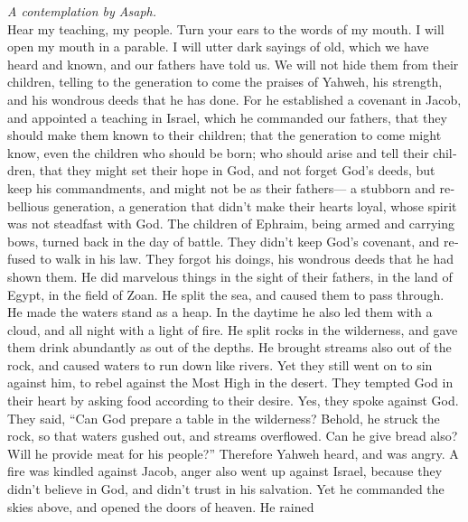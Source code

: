 \begin{paracol}{2}
\begin{otherlanguage}{english}
\emph{A contemplation by Asaph.}\\
 Hear my teaching, my people. Turn your ears to the words
of my mouth.  I will open my mouth in a parable. I will
utter dark sayings of old,  which we have heard and known,
and our fathers have told us.  We will not hide them from
their children, telling to the generation to come the praises of Yahweh,
his strength, and his wondrous deeds that he has done. 
For he established a covenant in Jacob, and appointed a teaching in
Israel, which he commanded our fathers, that they should make them known
to their children;  that the generation to come might
know, even the children who should be born; who should arise and tell
their children,  that they might set their hope in God,
and not forget God's deeds, but keep his commandments, 
and might not be as their fathers--- a stubborn and rebellious
generation, a generation that didn't make their hearts loyal, whose
spirit was not steadfast with God.  The children of
Ephraim, being armed and carrying bows, turned back in the day of
battle.  They didn't keep God's covenant, and refused to
walk in his law.  They forgot his doings, his wondrous
deeds that he had shown them.  He did marvelous things in
the sight of their fathers, in the land of Egypt, in the field of Zoan.
 He split the sea, and caused them to pass through. He
made the waters stand as a heap.  In the daytime he also
led them with a cloud, and all night with a light of fire.
 He split rocks in the wilderness, and gave them drink
abundantly as out of the depths.  He brought streams also
out of the rock, and caused waters to run down like rivers.
 Yet they still went on to sin against him, to rebel
against the Most High in the desert.  They tempted God in
their heart by asking food according to their desire. 
Yes, they spoke against God. They said, ``Can God prepare a table in the
wilderness?  Behold, he struck the rock, so that waters
gushed out, and streams overflowed. Can he give bread also? Will he
provide meat for his people?''  Therefore Yahweh heard,
and was angry. A fire was kindled against Jacob, anger also went up
against Israel,  because they didn't believe in God, and
didn't trust in his salvation.  Yet he commanded the
skies above, and opened the doors of heaven.  He rained

\end{otherlanguage}
\end{paracol}
